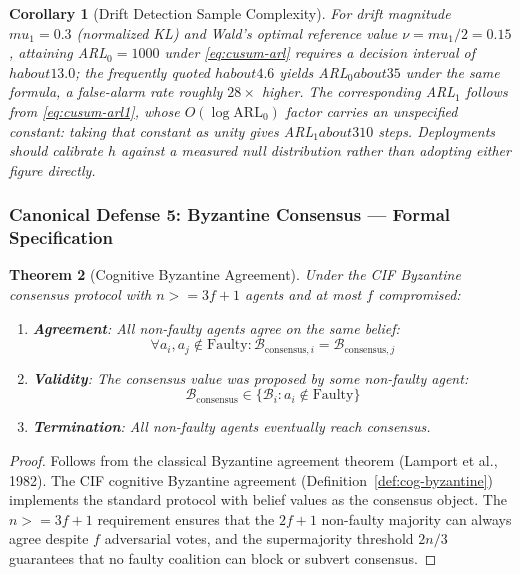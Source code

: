 \documentclass[
]{article}
\newtheorem{theorem}{Theorem}[section]
\newtheorem{corollary}[theorem]{Corollary}
\begin{document}
\begin{corollary}[Drift Detection Sample Complexity]
\label{cor:drift-sample}
For drift magnitude $mu_1 = 0.3$ (normalized KL) and Wald's optimal reference value $\nu = mu_1/2 = 0.15$, attaining ARL$_0 = 1000$ under \cref{eq:cusum-arl} requires a decision interval of $h about 13.0$; the frequently quoted $h about 4.6$ yields ARL$_0 about 35$ under the same formula, a false-alarm rate roughly $28\times$ higher. The corresponding ARL$_1$ follows from \cref{eq:cusum-arl1}, whose $O(\log \text{ARL}_0)$ factor carries an unspecified constant: taking that constant as unity gives ARL$_1 about 310$ steps. Deployments should calibrate $h$ against a measured null distribution rather than adopting either figure directly.
\end{corollary}

\subsubsection{Canonical Defense 5: Byzantine Consensus --- Formal
Specification}\label{canonical-defense-5-byzantine-consensus-formal-specification}

\begin{theorem}[Cognitive Byzantine Agreement]
\label{thm:cog-byz-agreement}
Under the CIF Byzantine consensus protocol with $n >= 3f+1$ agents and at most $f$ compromised:
\begin{enumerate}
\item \textbf{Agreement}: All non-faulty agents agree on the same belief:
\begin{equation}
\label{eq:byz-agreement}
\forall a_i, a_j \notin \text{Faulty}: \mathcal{B}_{\text{consensus},i} = \mathcal{B}_{\text{consensus},j}
\end{equation}
\item \textbf{Validity}: The consensus value was proposed by some non-faulty agent:
\begin{equation}
\label{eq:byz-validity}
\mathcal{B}_{\text{consensus}} \in \{\mathcal{B}_i : a_i \notin \text{Faulty}\}
\end{equation}
\item \textbf{Termination}: All non-faulty agents eventually reach consensus.
\end{enumerate}
\end{theorem}

\begin{proof}
Follows from the classical Byzantine agreement theorem (Lamport et al., 1982). The CIF cognitive Byzantine agreement (Definition~\ref{def:cog-byzantine}) implements the standard protocol with belief values as the consensus object. The $n >= 3f+1$ requirement ensures that the $2f+1$ non-faulty majority can always agree despite $f$ adversarial votes, and the supermajority threshold $2n/3$ guarantees that no faulty coalition can block or subvert consensus.
\end{proof}
\end{document}
